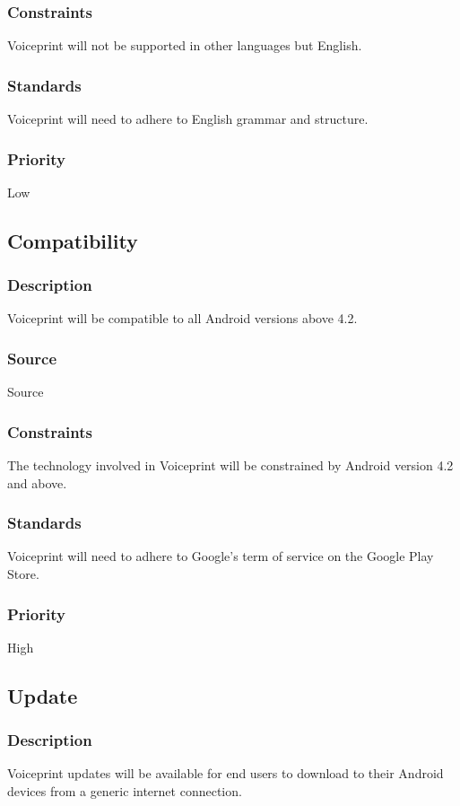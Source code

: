 \subsubsection{Constraints}
Voiceprint will not be supported in other languages but English.
\subsubsection{Standards}
Voiceprint will need to adhere to English grammar and structure.
\subsubsection{Priority}
Low

\subsection{Compatibility}
\subsubsection{Description}
Voiceprint will be compatible to all Android versions above 4.2.
\subsubsection{Source}
Source
\subsubsection{Constraints}
The technology involved in Voiceprint will be constrained by Android version 4.2 and above. 
\subsubsection{Standards}
Voiceprint will need to adhere to Google's term of service on the Google Play Store.
\subsubsection{Priority}
High

\subsection{Update}
\subsubsection{Description}
Voiceprint updates will be available for end users to download to their Android devices from a generic internet connection.
